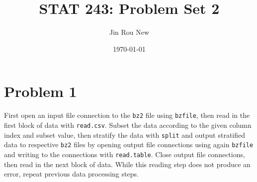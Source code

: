 \documentclass{article}\usepackage[]{graphicx}\usepackage[]{color}
\title{STAT 243: Problem Set 2}
\author{Jin Rou New}
\date{\today}
\begin{document}
\maketitle

\section{Problem 1}
First open an input file connection to the \texttt{bz2} file using \texttt{bzfile}, then read in the first block of data with \texttt{read.csv}. Subset the data according to the given column index and subset value, then stratify the data with \texttt{split} and output stratified data to respective \texttt{bz2} files by opening output file connections using again \texttt{bzfile} and writing to the connections with \texttt{read.table}. Close output file connections, then read in the next block of data. While this reading step does not produce an error, repeat previous data processing steps.

\end{document}
